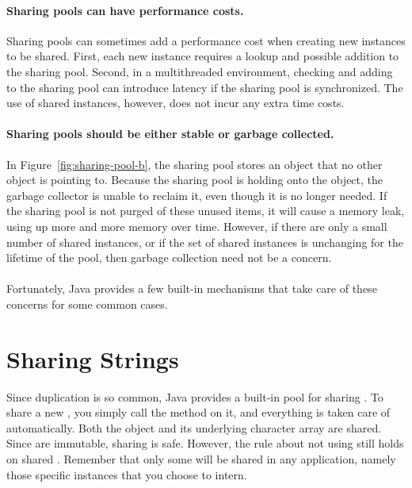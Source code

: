 \paragraph{Sharing pools can have performance costs.}
Sharing pools can sometimes add a performance cost when creating new instances
to be shared.  First, each new instance requires a lookup and possible
addition to the sharing pool. Second, in a multithreaded
environment, checking and adding to the sharing pool can introduce latency if the sharing pool is synchronized.
The use of shared instances, however, does not incur any extra
time costs.

\paragraph{Sharing pools should be either stable or garbage collected.} 
In Figure~\ref{fig:sharing-pool-b}, the sharing pool stores an object
that no other object is pointing to. Because the sharing pool is holding
onto the object, the garbage
collector is unable to reclaim it, even though it is no longer needed.  
If the sharing pool is not purged of these unused items, it will
cause a memory leak, using up more and more memory over time. However, if there
are only a small number of shared instances, or if the set of shared
instances is unchanging for the lifetime of the pool, then garbage collection need not be a concern.

\paragraph{} Fortunately, Java provides a few built-in mechanisms that take care
of these concerns for some common cases.

\section{Sharing Strings}
\label{sec:sharing-strings}

Since  duplication is so common, Java provides a built-in
pool for sharing . To share a new
, you simply call the method  on it, and 
everything is taken care of automatically. Both the 
object and its underlying character array are shared. Since
 are immutable, sharing is safe.
However, the rule about not using \code{==} still holds on shared
.  Remember that only some
 will be shared in any application, namely those specific
instances that you choose to intern.

